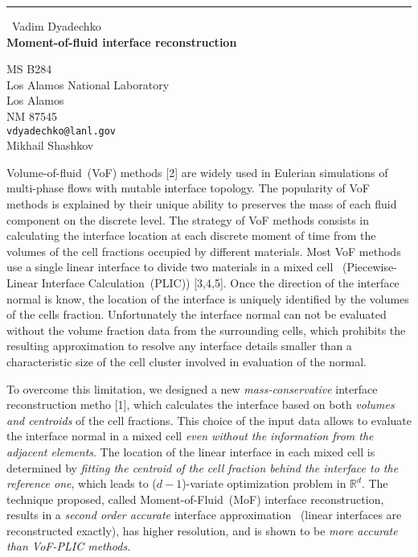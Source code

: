 \documentclass{report}
\begin{document}
\begin{center}
\rule{6in}{1pt} \
{\large Vadim Dyadechko \\
{\bf Moment-of-fluid interface reconstruction}}

MS B284 \\ Los Alamos National Laboratory \\ Los Alamos \\ NM 87545
\\
{\tt vdyadechko@lanl.gov}\\
Mikhail Shashkov\end{center}

\newcommand{\R}{\mathbb R}
\renewcommand{\tau}{\Delta t}
\newcommand{\centroid}[1]{\x_c(#1)}
\renewcommand{\vec}[1]{{\bf#1}}
\newcommand{\x}{\vec{x}}
Volume-of-fluid~(VoF) methods
[2]
are widely used in
Eulerian simulations
of multi-phase flows
with mutable
interface topology.
The popularity of VoF methods
is explained
by their unique ability to preserves
the mass of each fluid component
on the discrete level.
The strategy of VoF methods consists in
calculating the interface location
at each discrete moment of time
from the
volumes of the cell fractions
occupied by different materials.
Most
VoF methods
use a single linear interface
to divide two materials in a mixed cell%
~(Piecewise-Linear Interface Calculation~(PLIC))
[3,4,5].
Once the direction of the interface
normal
is know,
the location of the interface is uniquely
identified by the
volumes of the cells fraction.
Unfortunately the interface normal can not be evaluated
without the volume fraction data from the
surrounding cells,
which prohibits
the resulting approximation
to resolve any interface details
smaller than a characteristic size
of the cell cluster involved in
evaluation of the normal.

To overcome this limitation, we designed a new \emph{mass-conservative}
interface reconstruction metho
[1],
which calculates the interface based
on both \emph{volumes and centroids} of the cell fractions.
This choice of the input data
allows to evaluate the interface normal in a mixed cell
\emph{even without the information from the adjacent elements}.
The location of the linear interface in each mixed cell
is determined by \emph{fitting the centroid of the cell fraction
behind the interface to the reference one},
which leads to ($d-1$)-variate optimization problem in $\R^d$.
The technique proposed,
called Moment-of-Fluid~(MoF) interface reconstruction,
results in a \emph{second order accurate}
interface approximation~%
(linear interfaces are reconstructed exactly),
has higher resolution,
and is shown to be \emph{more accurate than VoF-PLIC methods}.
\end{document}
